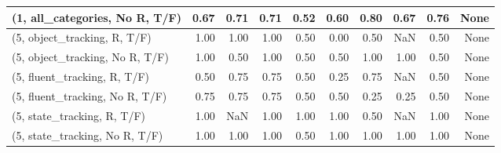 \begin{table*}[h!]
\begin{adjustbox}{width=2\columnwidth,center}
\begin{tabular}{lrrr|rrr|rrr}
(1, all\_categories, No R, T/F)       &                      0.67 &                  0.71 &                      0.71 &                          0.52 &                      0.60 &                          0.80 &                                   0.67 &                               0.76 &                                  None \\



\midrule
(5, object\_tracking, R, T/F)         &                      1.00 &                  1.00 &                      1.00 &                          0.50 &                      0.00 &                          0.50 &                                    NaN &                               0.50 &                                  None \\
(5, object\_tracking, No R, T/F)      &                      1.00 &                  0.50 &                      1.00 &                          0.50 &                      0.50 &                          1.00 &                                   1.00 &                               0.50 &                                  None \\
(5, fluent\_tracking, R, T/F)         &                      0.50 &                  0.75 &                      0.75 &                          0.50 &                      0.25 &                          0.75 &                                    NaN &                               0.50 &                                  None \\
(5, fluent\_tracking, No R, T/F)      &                      0.75 &                  0.75 &                      0.75 &                          0.50 &                      0.50 &                          0.25 &                                   0.25 &                               0.50 &                                  None \\
(5, state\_tracking, R, T/F)          &                      1.00 &                   NaN &                      1.00 &                          1.00 &                      1.00 &                          0.50 &                                    NaN &                               1.00 &                                  None \\
(5, state\_tracking, No R, T/F)       &                      1.00 &                  1.00 &                      1.00 &                          0.50 &                      1.00 &                          1.00 &                                   1.00 &                               1.00 &                                  None \\

\end{tabular}
\end{adjustbox}
\end{table*}
